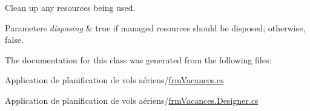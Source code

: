Clean up any resources being used. 


\begin{DoxyParams}{Parameters}
{\em disposing} & true if managed resources should be disposed; otherwise, false.\\
\hline
\end{DoxyParams}


The documentation for this class was generated from the following files\+:\begin{DoxyCompactItemize}
\item 
Application de planification de vols aériens/\hyperlink{frm_vacances_8cs}{frm\+Vacances.\+cs}\item 
Application de planification de vols aériens/\hyperlink{frm_vacances_8_designer_8cs}{frm\+Vacances.\+Designer.\+cs}\end{DoxyCompactItemize}
